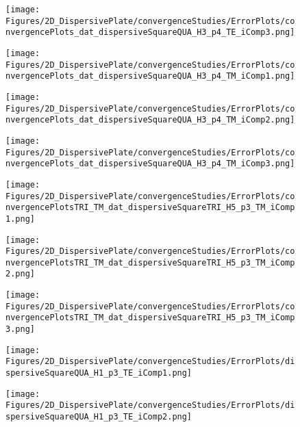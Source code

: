 \begin{figure}
\texttt{[image: Figures/2D\_DispersivePlate/convergenceStudies/ErrorPlots/convergencePlots\_dat\_dispersiveSquareQUA\_H3\_p4\_TE\_iComp3.png]}
\end{figure}

\begin{figure}
\texttt{[image: Figures/2D\_DispersivePlate/convergenceStudies/ErrorPlots/convergencePlots\_dat\_dispersiveSquareQUA\_H3\_p4\_TM\_iComp1.png]}
\end{figure}

\begin{figure}
\texttt{[image: Figures/2D\_DispersivePlate/convergenceStudies/ErrorPlots/convergencePlots\_dat\_dispersiveSquareQUA\_H3\_p4\_TM\_iComp2.png]}
\end{figure}

\begin{figure}
\texttt{[image: Figures/2D\_DispersivePlate/convergenceStudies/ErrorPlots/convergencePlots\_dat\_dispersiveSquareQUA\_H3\_p4\_TM\_iComp3.png]}
\end{figure}

\begin{figure}
\texttt{[image: Figures/2D\_DispersivePlate/convergenceStudies/ErrorPlots/convergencePlotsTRI\_TM\_dat\_dispersiveSquareTRI\_H5\_p3\_TM\_iComp1.png]}
\end{figure}

\begin{figure}
\texttt{[image: Figures/2D\_DispersivePlate/convergenceStudies/ErrorPlots/convergencePlotsTRI\_TM\_dat\_dispersiveSquareTRI\_H5\_p3\_TM\_iComp2.png]}
\end{figure}

\begin{figure}
\texttt{[image: Figures/2D\_DispersivePlate/convergenceStudies/ErrorPlots/convergencePlotsTRI\_TM\_dat\_dispersiveSquareTRI\_H5\_p3\_TM\_iComp3.png]}
\end{figure}

\begin{figure}
\texttt{[image: Figures/2D\_DispersivePlate/convergenceStudies/ErrorPlots/dispersiveSquareQUA\_H1\_p3\_TE\_iComp1.png]}
\end{figure}

\begin{figure}
\texttt{[image: Figures/2D\_DispersivePlate/convergenceStudies/ErrorPlots/dispersiveSquareQUA\_H1\_p3\_TE\_iComp2.png]}
\end{figure}

